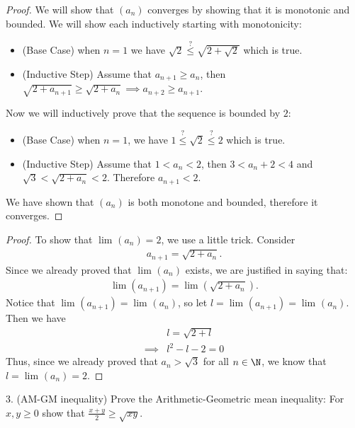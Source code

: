 \begin{proof}
	We will show that $\left( a_n \right) $ converges by showing that it is monotonic and bounded. We will show each inductively starting with monotonicity:
	\begin{itemize}
		\item (Base Case) when $n=1$ we have $\sqrt{2} \overset{?}{\le} \sqrt{2 + \sqrt{2}} $ which is true.
		\item (Inductive Step) Assume that $a_{n+1} \ge a_n$, then $\sqrt{2 + a_{n+1}} \ge \sqrt{2 + a_{n}} \implies a_{n+2} \ge a_{n+1}$. 
	\end{itemize}
	Now we will inductively prove that the sequence is bounded by $2$:
	\begin{itemize}
		\item (Base Case) when $n = 1$, we have  $1 \overset{?}{\le } \sqrt{2} \overset{?}{\le } 2$ which is true.
		\item (Inductive Step) Assume that $1 < a_n < 2$, then $3 < a_n + 2 < 4$ and $\sqrt{3} < \sqrt{2 + a_n} < 2$. Therefore $a_{n+1} < 2$.
	\end{itemize}
	We have shown that $\left( a_n \right) $ is both monotone and bounded, therefore it converges.	
\end{proof}

\begin{proof}
	To show that $\lim_{} \left( a_n \right) = 2$, we use a little trick. Consider
	\begin{align}
		a_{n+1} = \sqrt{2 + a_n}.
	\end{align}
	Since we already proved that $\lim_{} \left( a_n \right) $ exists, we are justified in saying that:
	\begin{align}
		\lim_{} \left( a_{n+1} \right) = \lim_{} \left( \sqrt{2 + a_n}\right).
	\end{align}
	Notice that $\lim_{} \left( a_{n+1} \right) = \lim_{} \left( a_n  \right) $, so let $l = \lim_{} \left( a_{n+1} \right) = \lim_{} \left( a_n  \right) $. Then we have
	\begin{align}
		&l = \sqrt{2 + l} \\
		\implies &l^{2} - l - 2 = 0
	\end{align}
	Thus, since we already proved that $a_n > \sqrt{3} $ for all $n \in \N$, we know that $l = \lim_{} \left( a_n \right) = 2$.
\end{proof}
3. (AM-GM inequality) Prove the Arithmetic-Geometric mean inequality: For $x, y \ge 0$ show that $\frac{x+y}{2} \ge \sqrt{xy} $.

